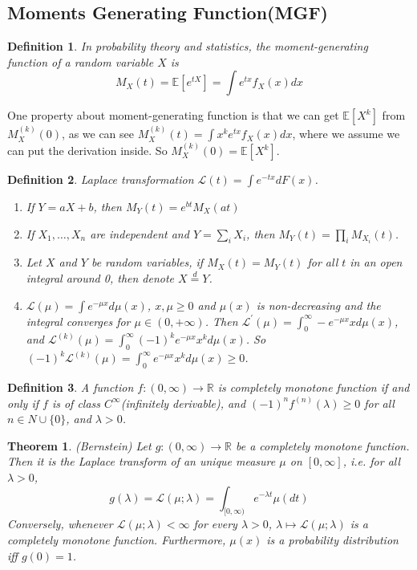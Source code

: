 \documentclass[11pt]{article}
\def\ML{{\mathcal L}}
\def\BR{{\mathbb R}}
\def\BE{{\mathbb E}}
\newtheorem{theorem}{Theorem}[section]
\newtheorem{definition}{Definition}[section]
\begin{document}
\subsection{Moments Generating Function(MGF)}
\begin{definition}
  In probability theory and statistics, the moment-generating function of a random variable $X$ is 
  \[M_X(t) = \BE[e^{tX}] = \int e^{tx} f_X(x) dx\]
\end{definition}
One property about moment-generating function is that we can get $\BE[X^k]$ from $M_X^{(k)}(0)$, 
as we can see $M_X^{(k)}(t) = \int x^k e^{tx} f_X(x) dx$, where we assume we can put the derivation inside. So $M_X^{(k)}(0) = \BE[X^k]$.
\begin{definition}
Laplace transformation $\ML(t)=\int e^{-tx}dF(x)$.\
\begin{enumerate}
\item If $Y=aX+b$, then $M_Y(t)=e^{bt}M_X(at)$
\item If $X_1,\dots,X_n$ are independent and $Y=\sum\limits_iX_i$, then $M_Y(t)=\prod\limits_iM_{X_i}(t)$.
\item Let $X$ and $Y$ be random variables, if $M_X(t)=M_Y(t)$ for all $t$ in an open integral around 0, then denote $X
\stackrel{d}{=}Y$.
\item $\ML(\mu)=\int e^{-\mu x}d\mu(x)$, $x,\mu\ge 0$ and $\mu(x)$ is non-decreasing and the integral converges for $\mu \in (0,+\infty)$. Then $\ML^{'}(\mu)=\int_0^{\infty}-e^{-\mu x}xd\mu(x)$, and $\ML^{(k)}(\mu)=\int_0^{\infty}(-1)^ke^{-\mu x}x^kd\mu(x)$. So $(-1)^k\ML^{(k)}(\mu)=\int_0^{\infty}e^{-\mu x}x^kd\mu(x)\ge 0$.
\end{enumerate} 
\end{definition}
\begin{definition}
  A function $f:(0, \infty) \rightarrow \BR$ is completely monotone function if and only if $f$ is of class $C^\infty$(infinitely derivable), and $(-1)^n f^{(n)}(\lambda) \geq 0$ for all $n \in N\cup\{0\}$, and $\lambda > 0$.
\end{definition}

\begin{theorem}(Bernstein)
  Let $g:(0,\infty) \rightarrow \BR$ be a completely monotone function. Then it is the Laplace transform of an unique measure $\mu$ on $[0,\infty]$, i.e. for all $\lambda > 0$, \[g(\lambda) =  \ML(\mu; \lambda) = \int_{[0, \infty)} e^{-\lambda t} \mu(dt)\] Conversely, whenever $\ML(\mu; \lambda) < \infty$ for every $\lambda > 0$,  $\lambda \mapsto  \ML(\mu; \lambda)$ is a completely monotone function. Furthermore, $\mu(x)$ is a probability distribution iff $g(0)=1$.
\end{theorem}
\end{document}
